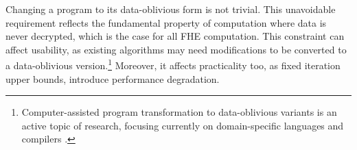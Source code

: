 


Changing a program to its data-oblivious form is not trivial. This unavoidable requirement reflects the fundamental property of computation where data is never decrypted, which is the case for all FHE computation. This constraint can affect usability, as existing algorithms may need modifications to be converted to a data-oblivious version.\footnote{Computer-assisted program transformation to data-oblivious variants is an active topic of research, focusing currently on domain-specific languages and compilers \cite{alchemy,fact}.} 
Moreover, it affects practicality too, as fixed iteration upper bounds, introduce performance degradation.





